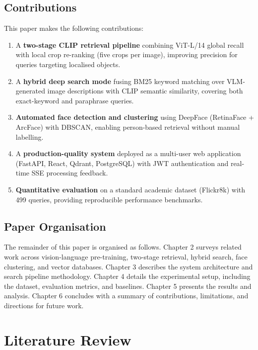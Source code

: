 \documentclass[12pt,a4paper,oneside]{report}
\begin{document}
\section{Contributions}

This paper makes the following contributions:

\begin{enumerate}[leftmargin=*]
  \item A \textbf{two-stage CLIP retrieval pipeline} combining ViT-L/14 global recall with local crop re-ranking (five crops per image), improving precision for queries targeting localised objects.
  \item A \textbf{hybrid deep search mode} fusing BM25 keyword matching over VLM-generated image descriptions with CLIP semantic similarity, covering both exact-keyword and paraphrase queries.
  \item \textbf{Automated face detection and clustering} using DeepFace (RetinaFace + ArcFace) with DBSCAN, enabling person-based retrieval without manual labelling.
  \item A \textbf{production-quality system} deployed as a multi-user web application (FastAPI, React, Qdrant, PostgreSQL) with JWT authentication and real-time SSE processing feedback.
  \item \textbf{Quantitative evaluation} on a standard academic dataset (Flickr8k) with 499 queries, providing reproducible performance benchmarks.
\end{enumerate}

\section{Paper Organisation}

The remainder of this paper is organised as follows. Chapter 2 surveys related work across vision-language pre-training, two-stage retrieval, hybrid search, face clustering, and vector databases. Chapter 3 describes the system architecture and search pipeline methodology. Chapter 4 details the experimental setup, including the dataset, evaluation metrics, and baselines. Chapter 5 presents the results and analysis. Chapter 6 concludes with a summary of contributions, limitations, and directions for future work.


\chapter{Literature Review}
\end{document}
